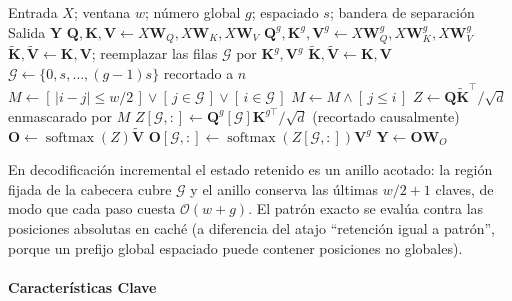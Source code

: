 \begin{algorithm}[H]
\caption{Atención de contexto limitado Fast Conformer (forma de referencia densa enmascarada)}
\begin{algorithmic}[1]
\Require Entrada $X$; ventana $w$; número global $g$; espaciado $s$; bandera de separación
\Ensure Salida $\mathbf{Y}$
\State $\mathbf{Q},\mathbf{K},\mathbf{V} \gets X\mathbf{W}_Q, X\mathbf{W}_K, X\mathbf{W}_V$
    \State $\mathbf{Q}^{g},\mathbf{K}^{g},\mathbf{V}^{g} \gets X\mathbf{W}_Q^{g}, X\mathbf{W}_K^{g}, X\mathbf{W}_V^{g}$
    \State $\tilde{\mathbf{K}}, \tilde{\mathbf{V}} \gets \mathbf{K}, \mathbf{V}$; reemplazar las filas $\mathcal{G}$ por $\mathbf{K}^{g}, \mathbf{V}^{g}$
\Else
    \State $\tilde{\mathbf{K}}, \tilde{\mathbf{V}} \gets \mathbf{K}, \mathbf{V}$
\EndIf
\State $\mathcal{G} \gets \{0, s, \dots, (g-1)s\}$ recortado a $n$
\State $M \gets [\,|i-j| \le w/2\,] \vee [\,j \in \mathcal{G}\,] \vee [\,i \in \mathcal{G}\,]$
 $M \gets M \wedge [\,j \le i\,]$ \EndIf
\State $Z \gets \mathbf{Q}\tilde{\mathbf{K}}^{\top}/\sqrt{d}$ enmascarado por $M$
    \State $Z[\mathcal{G},:] \gets \mathbf{Q}^{g}[\mathcal{G}]\mathbf{K}^{g\top}/\sqrt{d}$ (recortado causalmente)
\EndIf
\State $\mathbf{O} \gets \operatorname{softmax}(Z)\tilde{\mathbf{V}}$
    \State $\mathbf{O}[\mathcal{G},:] \gets \operatorname{softmax}(Z[\mathcal{G},:])\mathbf{V}^{g}$ 
\EndIf
\State $\mathbf{Y} \gets \mathbf{O}\mathbf{W}_O$
\end{algorithmic}
\end{algorithm}

En decodificación incremental el estado retenido es un anillo acotado: la región fijada de la cabecera cubre $\mathcal{G}$ y el anillo conserva las últimas $w/2+1$ claves, de modo que cada paso cuesta $\mathcal{O}(w+g)$. El patrón exacto se evalúa contra las posiciones absolutas en caché (a diferencia del atajo ``retención igual a patrón'', porque un prefijo global espaciado puede contener posiciones no globales).

\paragraph{Características Clave}

